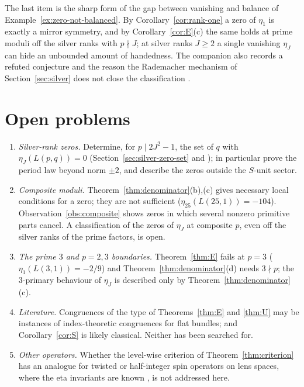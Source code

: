 \documentclass[11pt]{article}
\theoremstyle{definition}
\begin{document}
The last item is the sharp form of the gap between vanishing and balance
of Example~\ref{ex:zero-not-balanced}.  By Corollary~\ref{cor:rank-one}
a zero of $\eta_1$ is exactly a mirror symmetry, and by
Corollary~\ref{cor:E}(c) the same holds at prime moduli off the silver
ranks with $p\nmid J$; at silver ranks $J\geq2$ a single vanishing $\eta_J$ can hide an
unbounded amount of handedness.  The companion also records a refuted
conjecture \cite[Conj.~4.6]{SilverRankZeros2026} and the reason the
Rademacher mechanism of Section~\ref{sec:silver} does not close the
classification \cite[Rem.~4.5]{SilverRankZeros2026}.

\section{Open problems}
\label{sec:open}

\begin{enumerate}[label=(\arabic*)]
\item \emph{Silver-rank zeros.}  Determine, for $p\mid2J^2-1$, the set of
$q$ with $\eta_J(L(p,q))=0$ (Section~\ref{sec:silver-zero-set} and
\cite[Sec.~9]{SilverRankZeros2026}); in particular prove the period law
\cite[Conj.~7.1]{SilverRankZeros2026} beyond norm $\pm2$, and describe
the zeros outside the $S$-unit sector.
\item \emph{Composite moduli.}  Theorem~\ref{thm:denominator}(b),(c) gives
necessary local conditions for a zero; they are not sufficient
($\eta_{25}(L(25,1))=-104$).  Observation~\ref{obs:composite} shows zeros
in which several nonzero primitive parts cancel.  A classification of
the zeros of $\eta_J$ at composite $p$, even off the silver ranks of the
prime factors, is open.
\item \emph{The prime $3$ and $p=2,3$ boundaries.}  Theorem~\ref{thm:E}
fails at $p=3$ ($\eta_1(L(3,1))=-2/9$) and Theorem~\ref{thm:denominator}(d)
needs $3\nmid p$; the $3$-primary behaviour of $\eta_J$ is described only
by Theorem~\ref{thm:denominator}(c).
\item \emph{Literature.}  Congruences of the type of Theorems~\ref{thm:E}
and \ref{thm:U} may be instances of index-theoretic congruences for
flat bundles; and Corollary~\ref{cor:S} is likely classical.  Neither
has been searched for.
\item \emph{Other operators.}  Whether the level-wise criterion of
Theorem~\ref{thm:criterion} has an analogue for twisted or half-integer
spin operators on lens spaces, where the eta invariants are known
\cite{Bar1996,Boldt2017}, is not addressed here.
\end{enumerate}
\end{document}
